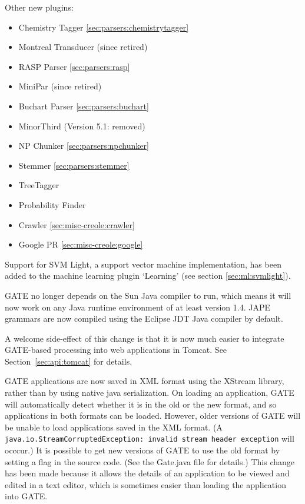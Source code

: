 Other new plugins:
\begin{itemize}
\item Chemistry Tagger \ref{sec:parsers:chemistrytagger}
\item Montreal Transducer (since retired)
\item RASP Parser \ref{sec:parsers:rasp}
\item MiniPar (since retired)
\item Buchart Parser \ref{sec:parsers:buchart}
\item MinorThird (Version 5.1: removed)
\item NP Chunker \ref{sec:parsers:npchunker}
\item Stemmer \ref{sec:parsers:stemmer}
\item TreeTagger %
\item Probability Finder %
\item Crawler \ref{sec:misc-creole:crawler}
\item Google PR \ref{sec:misc-creole:google}
\end{itemize}

Support for SVM Light, a support vector machine implementation, has been added
to the machine learning plugin `Learning' (see section \ref{sec:ml:svmlight}).



GATE no longer depends on the Sun Java compiler to run, which means it will now
work on any Java runtime environment of at least version 1.4.  JAPE grammars
are now compiled using the Eclipse JDT Java compiler by default.

A welcome side-effect of this change is that it is now much easier to integrate
GATE-based processing into web applications in Tomcat.  See
Section~\ref{sec:api:tomcat} for details.


GATE applications are now saved in XML format using the XStream library,
rather than by using native java
serialization. On loading an application, GATE
will automatically detect whether it is in the old or the new format, and so
applications in both formats can be loaded. However, older
versions of GATE will be unable to load applications saved in the XML format. (A
{\tt java.io.StreamCorruptedException: invalid stream header exception} will
occcur.) It is possible to get new versions of GATE to use the old format by
setting a flag in the source code. (See the Gate.java file for details.) This
change has been made because it allows the details of an application to be
viewed and edited in a text editor, which is sometimes easier than loading the
application into GATE.

